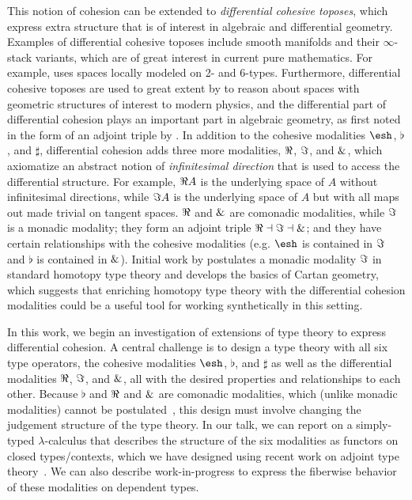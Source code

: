 \documentclass{article}
\begin{document}
This notion of cohesion can be extended to \emph{differential cohesive
  toposes}, which express extra structure that is of interest in
algebraic and differential geometry.  Examples of differential cohesive
toposes include smooth manifolds and their $\infty$-stack variants,
which are of great interest in current pure mathematics. For example,
\citet{SatiSchreiberStasheff2012} uses spaces locally modeled on 2- and
6-types.  Furthermore, differential cohesive toposes are used to great
extent by \citet{Schreiber2013} to reason about spaces with geometric
structures of interest to modern physics, and the differential part of
differential cohesion plays an important part in algebraic geometry, as
first noted in the form of an adjoint triple by \citet{SimpsonTeleman}.
In addition to the cohesive modalities $\shape$, $\flat$, and $\sharp$,
differential cohesion adds three more modalities, $\Re$, $\Im$, and
$\&$, which axiomatize an abstract notion of \emph{infinitesimal
  direction} that is used to access the differential structure.  For
example, $\Re A$ is the underlying space of $A$ without infinitesimal
directions, while $\Im A$ is the underlying space of $A$ but with all
maps out made trivial on tangent spaces.  $\Re$ and $\&$ are comonadic
modalities, while $\Im$ is a monadic modality; they form an adjoint
triple $\Re \dashv \Im \dashv \&$; and they have certain
relationships with the cohesive modalities (e.g. $\shape$ is contained
in $\Im$ and $\flat$ is contained in $\&$).  Initial work by
\citet{Wellen2017} postulates a monadic modality $\Im$ in standard
homotopy type theory and develops the basics of Cartan geometry, which
suggests that enriching homotopy type theory with the differential
cohesion modalities could be a useful tool for working synthetically in
this setting.
 

In this work, we begin an investigation of extensions of type theory to
express differential cohesion.  A central challenge is to design a type
theory with all six type operators, the cohesive modalities $\shape$,
$\flat$, and $\sharp$ as well as the differential modalities $\Re$,
$\Im$, and $\&$, all with the desired properties and relationships
to each other.  Because $\flat$ and $\Re$ and $\&$ are comonadic
modalities, which (unlike monadic modalities) cannot be
postulated~\citep{Shulman2015}, this design must involve changing the
judgement structure of the type theory.  In our talk, we can report on a
simply-typed $\lambda$-calculus that describes the structure of the six
modalities as functors on closed types/contexts, which we have designed
using recent work on adjoint type theory~\citet{Licata2017}.  We can
also describe work-in-progress to express the fiberwise behavior of
these modalities on dependent types.
\end{document}
